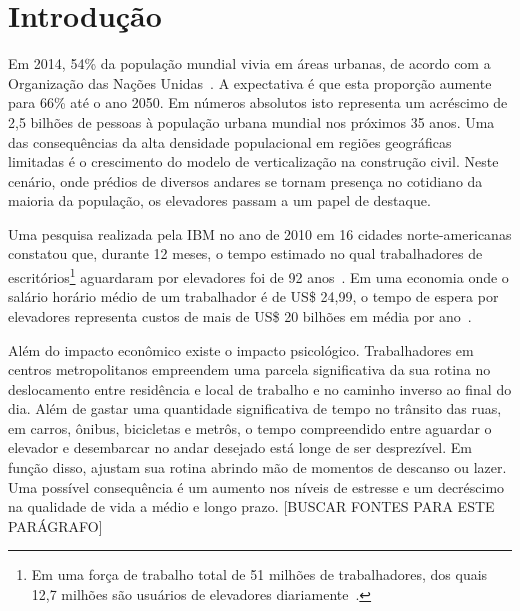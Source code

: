 \chapter{\label{chap:intro}Introdução}

Em 2014, 54\% da população mundial vivia em áreas urbanas, de acordo com a Organização das Nações Unidas~\cite{UN14}. A expectativa é que esta proporção aumente para 66\% até o ano 2050. Em números absolutos isto representa um acréscimo de 2,5 bilhões de pessoas à população urbana mundial nos próximos 35 anos. Uma das consequências da alta densidade populacional em regiões geográficas limitadas é o crescimento do modelo de verticalização na construção civil. Neste cenário, onde prédios de diversos andares se tornam presença no cotidiano da maioria da população, os elevadores passam a um papel de destaque.

Uma pesquisa realizada pela IBM no ano de 2010 em 16 cidades norte-americanas constatou que, durante 12 meses, o tempo estimado no qual trabalhadores de escritórios\footnote{Em uma força de trabalho total de 51 milhões de trabalhadores, dos quais 12,7 milhões são usuários de elevadores diariamente~\cite{IBM10}.} aguardaram por elevadores foi de 92 anos~\cite{IBM10}. Em uma economia onde o salário horário médio de um trabalhador é de US\$ 24,99, o tempo de espera por elevadores representa custos de mais de US\$ 20 bilhões em média por ano~\cite{BLS15}.

Além do impacto econômico existe o impacto psicológico. Trabalhadores em centros metropolitanos empreendem uma parcela significativa da sua rotina no deslocamento entre residência e local de trabalho e no caminho inverso ao final do dia. Além de gastar uma quantidade significativa de tempo no trânsito das ruas, em carros, ônibus, bicicletas e metrôs, o tempo compreendido entre aguardar o elevador e desembarcar no andar desejado está longe de ser desprezível. Em função disso, ajustam sua rotina abrindo mão de momentos de descanso ou lazer. Uma possível consequência é um aumento nos níveis de estresse e um decréscimo na qualidade de vida a médio e longo prazo. {\color{red}[BUSCAR FONTES PARA ESTE PARÁGRAFO]} %

